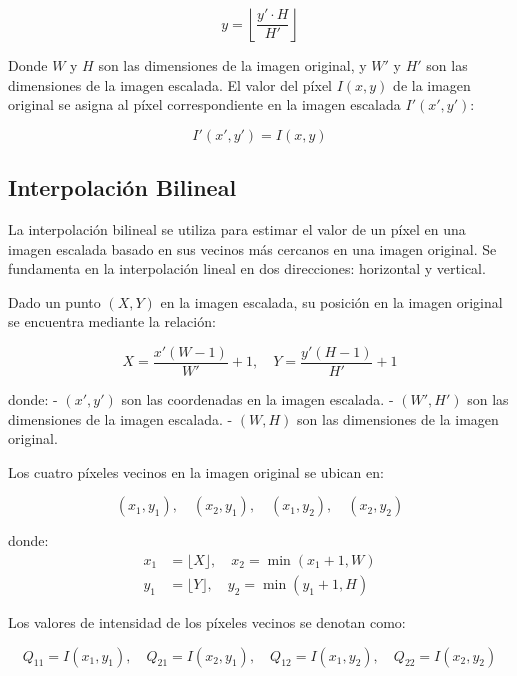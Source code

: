 \documentclass[11pt, letterpaper]{article}
\begin{document}
	\begin{equation}
		y = \left\lfloor \frac{y' \cdot H}{H'} \right\rfloor
	\end{equation}
	
	Donde \( W \) y \( H \) son las dimensiones de la imagen original, y \( W' \) y \( H' \) son las dimensiones de la imagen escalada. El valor del píxel \( I(x, y) \) de la imagen original se asigna al píxel correspondiente en la imagen escalada \( I'(x', y') \):
	
	\begin{equation}
		I'(x', y') = I(x, y)
	\end{equation}
	
	\subsection{Interpolación Bilineal}
	
	La interpolación bilineal se utiliza para estimar el valor de un píxel en una imagen escalada basado en sus vecinos más cercanos en una imagen original. Se fundamenta en la interpolación lineal en dos direcciones: horizontal y vertical.
	
	Dado un punto $(X, Y)$ en la imagen escalada, su posición en la imagen original se encuentra mediante la relación:
	
	\begin{equation}
		X = \frac{x' (W - 1)}{W'} + 1, \quad Y = \frac{y' (H - 1)}{H'} + 1
	\end{equation}
	
	donde:
	- $(x', y')$ son las coordenadas en la imagen escalada.
	- $(W', H')$ son las dimensiones de la imagen escalada.
	- $(W, H)$ son las dimensiones de la imagen original.
	
	Los cuatro píxeles vecinos en la imagen original se ubican en:
	
	\begin{equation}
		(x_1, y_1), \quad (x_2, y_1), \quad (x_1, y_2), \quad (x_2, y_2)
	\end{equation}
	
	donde:
	\begin{align*}
		x_1 &= \lfloor X \rfloor, \quad x_2 = \min(x_1 + 1, W) \\
		y_1 &= \lfloor Y \rfloor, \quad y_2 = \min(y_1 + 1, H)
	\end{align*}
	
	Los valores de intensidad de los píxeles vecinos se denotan como:
	
	\begin{equation}
		Q_{11} = I(x_1, y_1), \quad Q_{21} = I(x_2, y_1), \quad Q_{12} = I(x_1, y_2), \quad Q_{22} = I(x_2, y_2)
	\end{equation}
	
\end{document}
